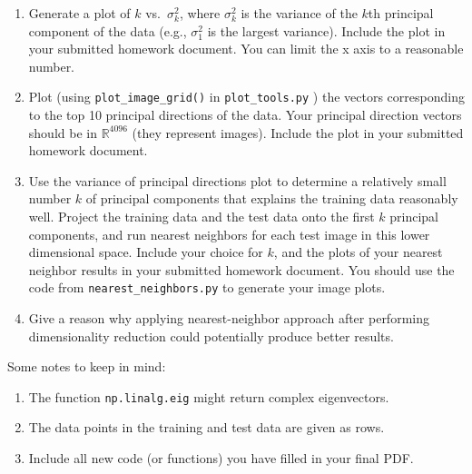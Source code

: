 \documentclass[12pt,twoside]{article}
\begin{document}
\begin{enumerate}
\begin{enumerate}
\item Generate a plot of $k$ vs.~$\sigma^2_k$, where $\sigma^2_k$ is
the variance of the $k$th principal component of the data (e.g., $\sigma^2_1$
is the largest variance). 
Include the plot in your submitted homework document. You can limit the x axis to a reasonable number.
\item  Plot (using  \verb|plot_image_grid()| in
\verb|plot_tools.py| ) the vectors
corresponding to the top 10 principal directions of the data.
Your principal direction vectors should be in $\mathbb{R}^{4096}$ (they represent images).
Include the plot in your submitted homework document.
\item Use the variance of principal directions plot to determine a 
relatively small number $k$ of principal components
that explains the training data reasonably well.
Project the training data 
and the test data onto the
first $k$ principal components, and run nearest neighbors for
each test image in this lower dimensional space.  Include your
choice for $k$, and the plots
of your nearest neighbor results in your submitted homework
document.  You should use the code from
 \verb|nearest_neighbors.py| to generate your image plots.
\item Give a reason why applying 
nearest-neighbor approach after performing dimensionality reduction could potentially produce better results.
\end{enumerate}

  Some notes to keep in mind:
  \begin{enumerate}
  \item The function {\tt np.linalg.eig} might return complex eigenvectors.
  \item The data points in the training and test data are given as
    rows.
    \item Include all new code (or functions) you have filled in your final PDF.
 \end{enumerate}

 \end{enumerate}
 
\end{document}
